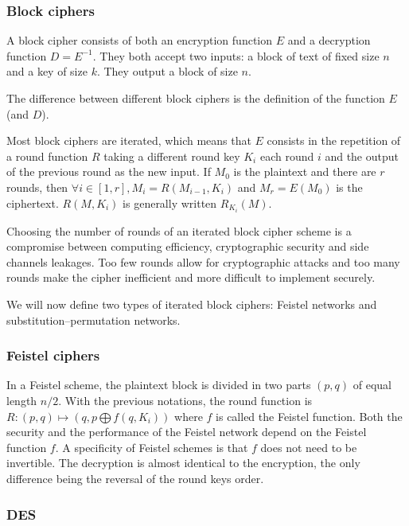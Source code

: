 \documentclass[11pt]{sdm}
\begin{document}
\subsubsection{Block ciphers}

A block cipher consists of both an encryption function $E$ and a decryption function $D=E^{-1}$.
They both accept two inputs: a block of text of fixed size $n$ and a key of size $k$.
They output a block of size $n$.

The difference between different block ciphers is the definition of the function $E$ (and $D$).

Most block ciphers are iterated, which means that $E$ consists in the repetition of a round function $R$ taking a different round key $K_i$ each round $i$ and the output of the previous round as the new input.
If $M_0$ is the plaintext and there are $r$ rounds, then $ \forall i \in [ 1,r ] , M_i = R(M_{i-1},K_i) $ and $M_r = E(M_0)$ is the ciphertext.
$R(M,K_i)$ is generally written $R_{K_i}(M)$.

Choosing the number of rounds of an iterated block cipher scheme is a compromise between computing efficiency, cryptographic security and side channels leakages.
Too few rounds allow for cryptographic attacks and too many rounds make the cipher inefficient and more difficult to implement securely.

We will now define two types of iterated block ciphers: Feistel networks and substitution–permutation networks.

\subsubsection{Feistel ciphers}

In a Feistel scheme, the plaintext block is divided in two parts $(p,q)$ of equal length $n/2$.
With the previous notations, the round function is $R: (p,q) \mapsto (q,p \bigoplus f(q,K_i))$ where $f$ is called the Feistel function.
Both the security and the performance of the Feistel network depend on the Feistel function $f$.
A specificity of Feistel schemes is that $f$ does not need to be invertible.
The decryption is almost identical to the encryption, the only difference being the reversal of the round keys order.


\subsubsection{DES}
\end{document}
